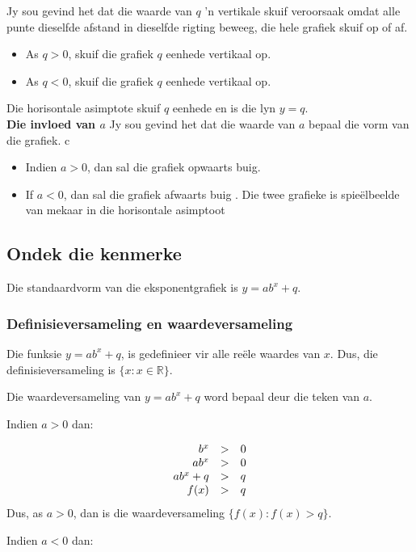 Jy sou gevind het dat die waarde van $q$ 'n vertikale skuif veroorsaak omdat alle punte dieselfde afstand in dieselfde rigting beweeg, die hele grafiek skuif op of af. 
\begin{itemize}
\item As $q>0$, skuif die grafiek $q$ eenhede vertikaal op. 
\item As $q<0$, skuif die grafiek $q$ eenhede vertikaal op.
\end{itemize}
Die horisontale asimptote skuif $q$ eenhede en is die lyn $y=q$. \vspace{8pt}\\


\textbf{Die invloed van $a$}\newline
Jy sou gevind het dat die waarde van $a$ bepaal die vorm van die grafiek. c
\begin{itemize}
 \item Indien $a>0$, dan sal die grafiek opwaarts buig.
\item If $a<0$, dan sal die grafiek afwaarts buig . Die twee grafieke is spie\"elbeelde van mekaar in die horisontale asimptoot
\end{itemize}

\subsection*{Ondek die kenmerke}
Die standaardvorm van die eksponentgrafiek is $y=ab^{x} + q$.
\subsubsection*{Definisieversameling en waardeversameling}

Die funksie $y=ab^{x}+q$, is gedefinieer vir alle reële waardes van $x$. Dus, die definisieversameling is $\{x:x\in \mathbb{R}\}$.\par 
Die waardeversameling van $y=ab^{x}+q$ word bepaal deur die teken van $a$.\par 
Indien $a>0$ dan:\par
\begin{equation*}
\begin{array}{ccc}\hfill b^{x}& > & 0\hfill \\
 \hfill ab^{x}& > & 0\hfill \\ 
\hfill ab^{x}+q& > & q\hfill \\ 
\hfill f(x)& > & q\hfill 
\end{array}
\end{equation*}
Dus, as  $a>0$, dan is die waardeversameling  $\{f(x):f(x) > q\}$.\par 
Indien $a<0$ dan:\par 

